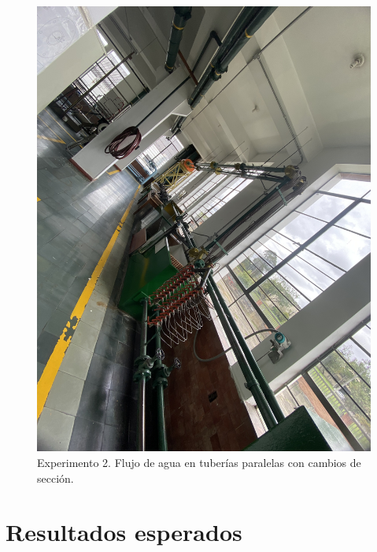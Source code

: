 \documentclass[10pt, a4paper]{exam}
\begin{document}
\begin{figure}[h]
    \centering
    \includegraphics[width=\textwidth]{exp2.jpg}
    \caption{Experimento 2. Flujo de agua en tuber\'ias paralelas con cambios de secci\'on.}
    \label{exp2}
\end{figure}


\section{Resultados esperados}
\end{document}
